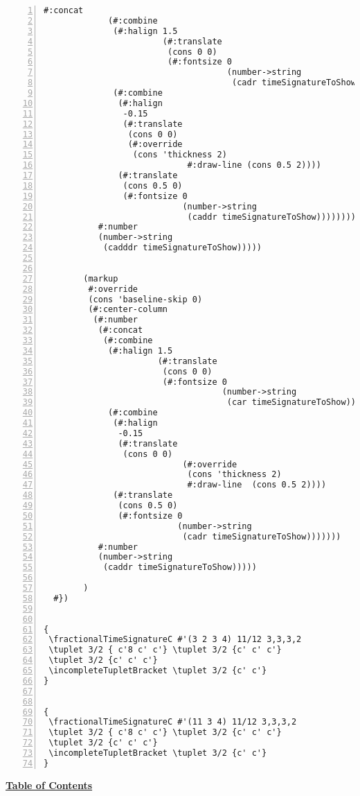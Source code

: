 \begin{Verbatim}[numbers=left,xleftmargin=5mm]
             #:concat
             (#:combine
              (#:halign 1.5
                        (#:translate 
                         (cons 0 0) 
                         (#:fontsize 0 
                                     (number->string 
                                      (cadr timeSignatureToShow)))))
              (#:combine
               (#:halign
                -0.15
                (#:translate 
                 (cons 0 0) 
                 (#:override 
                  (cons 'thickness 2) 
                             #:draw-line (cons 0.5 2))))
               (#:translate 
                (cons 0.5 0) 
                (#:fontsize 0 
                            (number->string 
                             (caddr timeSignatureToShow))))))))
           #:number
           (number->string 
            (cadddr timeSignatureToShow)))))


        (markup
         #:override
         (cons 'baseline-skip 0)
         (#:center-column
          (#:number
           (#:concat
            (#:combine
             (#:halign 1.5 
                       (#:translate 
                        (cons 0 0) 
                        (#:fontsize 0  
                                    (number->string 
                                     (car timeSignatureToShow)))))
             (#:combine
              (#:halign
               -0.15
               (#:translate 
                (cons 0 0) 
                            (#:override 
                             (cons 'thickness 2) 
                             #:draw-line  (cons 0.5 2))))
              (#:translate 
               (cons 0.5 0) 
               (#:fontsize 0 
                           (number->string 
                            (cadr timeSignatureToShow)))))))
           #:number
           (number->string 
            (caddr timeSignatureToShow)))))

        )
  #})


{
 \fractionalTimeSignatureC #'(3 2 3 4) 11/12 3,3,3,2
 \tuplet 3/2 { c'8 c' c'} \tuplet 3/2 {c' c' c'}
 \tuplet 3/2 {c' c' c'}
 \incompleteTupletBracket \tuplet 3/2 {c' c'}
}


{
 \fractionalTimeSignatureC #'(11 3 4) 11/12 3,3,3,2
 \tuplet 3/2 { c'8 c' c'} \tuplet 3/2 {c' c' c'}
 \tuplet 3/2 {c' c' c'}
 \incompleteTupletBracket \tuplet 3/2 {c' c'}
}
\end{Verbatim}

\hyperref[sec:toc]{\textbf{Table of Contents}}

\vfill \break

